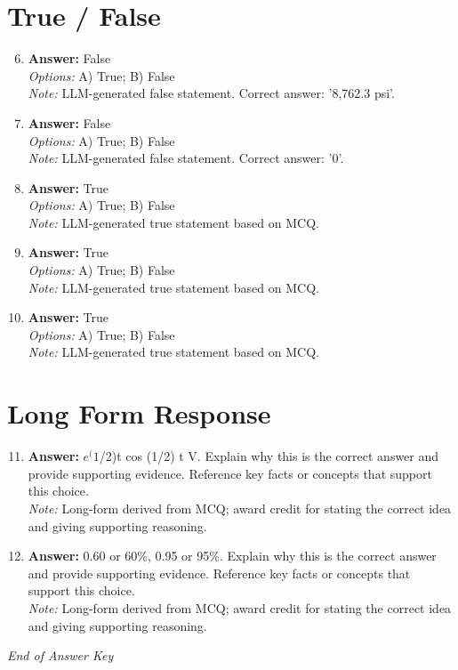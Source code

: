 \documentclass[12pt]{article}
\begin{document}
\section*{True / False}
\begin{enumerate}[label=\arabic*.]
\setcounter{enumi}{5}
\item \textbf{Answer:} False
\\ \textit{Options:} A) True; B) False
\\ \textit{Note:} LLM-generated false statement. Correct answer: '8,762.3 psi'.
\item \textbf{Answer:} False
\\ \textit{Options:} A) True; B) False
\\ \textit{Note:} LLM-generated false statement. Correct answer: '0'.
\item \textbf{Answer:} True
\\ \textit{Options:} A) True; B) False
\\ \textit{Note:} LLM-generated true statement based on MCQ.
\item \textbf{Answer:} True
\\ \textit{Options:} A) True; B) False
\\ \textit{Note:} LLM-generated true statement based on MCQ.
\item \textbf{Answer:} True
\\ \textit{Options:} A) True; B) False
\\ \textit{Note:} LLM-generated true statement based on MCQ.
\end{enumerate}

\section*{Long Form Response}
\begin{enumerate}[label=\arabic*.]
\setcounter{enumi}{10}
\item \textbf{Answer:} $e^(1$/2)t cos (1/2) t V. Explain why this is the correct answer and provide supporting evidence. Reference key facts or concepts that support this choice.
\\ \textit{Note:} Long-form derived from MCQ; award credit for stating the correct idea and giving supporting reasoning.
\item \textbf{Answer:} 0.60 or 60\%, 0.95 or 95\%. Explain why this is the correct answer and provide supporting evidence. Reference key facts or concepts that support this choice.
\\ \textit{Note:} Long-form derived from MCQ; award credit for stating the correct idea and giving supporting reasoning.
\end{enumerate}

\vfill
\noindent\textit{End of Answer Key}
\end{document}
